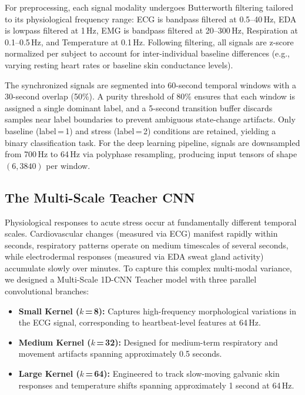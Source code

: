 \documentclass[conference]{IEEEtran}
\begin{document}
For preprocessing, each signal modality undergoes Butterworth filtering tailored to its physiological frequency range: ECG is bandpass filtered at 0.5--40\,Hz, EDA is lowpass filtered at 1\,Hz, EMG is bandpass filtered at 20--300\,Hz, Respiration at 0.1--0.5\,Hz, and Temperature at 0.1\,Hz. Following filtering, all signals are z-score normalized per subject to account for inter-individual baseline differences (e.g., varying resting heart rates or baseline skin conductance levels).

The synchronized signals are segmented into 60-second temporal windows with a 30-second overlap (50\%). A purity threshold of 80\% ensures that each window is assigned a single dominant label, and a 5-second transition buffer discards samples near label boundaries to prevent ambiguous state-change artifacts. Only baseline (label\,=\,1) and stress (label\,=\,2) conditions are retained, yielding a binary classification task. For the deep learning pipeline, signals are downsampled from 700\,Hz to 64\,Hz via polyphase resampling, producing input tensors of shape $(6, 3840)$ per window.

\subsection{The Multi-Scale Teacher CNN}

Physiological responses to acute stress occur at fundamentally different temporal scales. Cardiovascular changes (measured via ECG) manifest rapidly within seconds, respiratory patterns operate on medium timescales of several seconds, while electrodermal responses (measured via EDA sweat gland activity) accumulate slowly over minutes. To capture this complex multi-modal variance, we designed a Multi-Scale 1D-CNN Teacher model with three parallel convolutional branches:

\begin{itemize}
    \item \textbf{Small Kernel ($k$\,=\,8):} Captures high-frequency morphological variations in the ECG signal, corresponding to heartbeat-level features at 64\,Hz.
    \item \textbf{Medium Kernel ($k$\,=\,32):} Designed for medium-term respiratory and movement artifacts spanning approximately 0.5 seconds.
    \item \textbf{Large Kernel ($k$\,=\,64):} Engineered to track slow-moving galvanic skin responses and temperature shifts spanning approximately 1 second at 64\,Hz.
\end{itemize}
\end{document}
